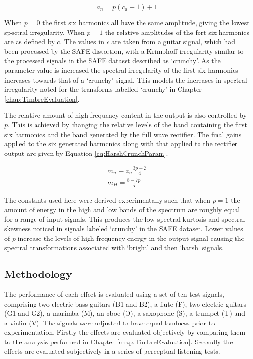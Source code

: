 			\begin{equation}
				a_{n} = p(c_{n} - 1) + 1
				\label{eq:HarshCrunchAmps}
			\end{equation}

			When $p = 0$ the first six harmonics all have the same amplitude, giving the lowest spectral
			irregularity. When $p = 1$ the relative amplitudes of the fort six harmonics are as defined by $c$.
			The values in $c$ are taken from a guitar signal, which had been processed by the SAFE distortion,
			with a Krimphoff irregularity similar to the processed signals in the SAFE dataset described as
			`crunchy'. As the parameter value is increased the spectral irregularity of the first six harmonics
			increases towards that of a `crunchy' signal. This models the increases in spectral irregularity
			noted for the transforms labelled `crunchy' in Chapter \ref{chap:TimbreEvaluation}.
			
			The relative amount of high frequency content in the output is also controlled by $p$. This is
			achieved by changing the relative levels of the band containing the first six harmonics and the
			band generated by the full wave rectifier. The final gains applied to the six generated harmonics
			along with that applied to the rectifier output are given by Equation \ref{eq:HarshCrunchParam}.

			\begin{gather}
				m_{n} = a_{n}\frac{3p + 2}{4} \nonumber \\
				m_{H} = \frac{8 - 7p}{5}
				\label{eq:HarshCrunchParam}
			\end{gather}

			The constants used here were derived experimentally such that when $p = 1$ the amount of energy in
			the high and low bands of the spectrum are roughly equal for a range of input signals. This
			produces the low spectral kurtosis and spectral skewness noticed in signals labeled `crunchy' in
			the SAFE dataset. Lower values of $p$ increase the levels of high frequency energy in the output
			signal causing the spectral transformations associated with `bright' and then `harsh' signals.

	\subsection{Methodology}
	\label{sec:PerceptualExperiments-SemanticControl-Methodology}
		The performance of each effect is evaluated using a set of ten test signals, comprising two electric bass
		guitars (B1 and B2), a flute (F), two electric guitars (G1 and G2), a marimba (M), an oboe (O), a saxophone
		(S), a trumpet (T) and a violin (V). The signals were adjusted to have equal loudness prior to
		experimentation.  Firstly the effects are evaluated objectively by comparing them to the analysis performed
		in Chapter \ref{chap:TimbreEvaluation}. Secondly the effects are evaluated subjectively in a series of
		perceptual listening tests.

